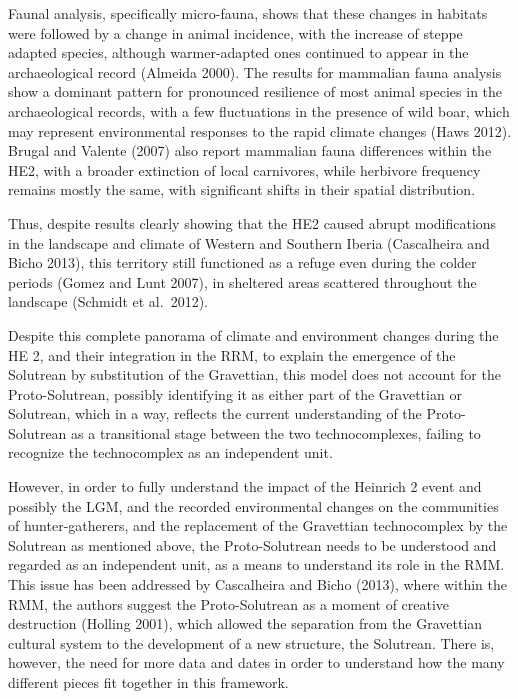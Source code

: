 \documentclass[12pt,twoside]{reedthesis}
\begin{document}
Faunal analysis, specifically micro-fauna, shows that these changes in habitats were followed by a change in animal incidence, with the increase of steppe adapted species, although warmer-adapted ones continued to appear in the archaeological record (Almeida 2000). The results for mammalian fauna analysis show a dominant pattern for pronounced resilience of most animal species in the archaeological records, with a few fluctuations in the presence of wild boar, which may represent environmental responses to the rapid climate changes (Haws 2012). Brugal and Valente (2007) also report mammalian fauna differences within the HE2, with a broader extinction of local carnivores, while herbivore frequency remains mostly the same, with significant shifts in their spatial distribution.

Thus, despite results clearly showing that the HE2 caused abrupt modifications in the landscape and climate of Western and Southern Iberia (Cascalheira and Bicho 2013), this territory still functioned as a refuge even during the colder periods (Gomez and Lunt 2007), in sheltered areas scattered throughout the landscape (Schmidt et al.~2012).

Despite this complete panorama of climate and environment changes during the HE 2, and their integration in the RRM, to explain the emergence of the Solutrean by substitution of the Gravettian, this model does not account for the Proto-Solutrean, possibly identifying it as either part of the Gravettian or Solutrean, which in a way, reflects the current understanding of the Proto-Solutrean as a transitional stage between the two technocomplexes, failing to recognize the technocomplex as an independent unit.

However, in order to fully understand the impact of the Heinrich 2 event and possibly the LGM, and the recorded environmental changes on the communities of hunter-gatherers, and the replacement of the Gravettian technocomplex by the Solutrean as mentioned above, the Proto-Solutrean needs to be understood and regarded as an independent unit, as a means to understand its role in the RMM. This issue has been addressed by Cascalheira and Bicho (2013), where within the RMM, the authors suggest the Proto-Solutrean as a moment of creative destruction (Holling 2001), which allowed the separation from the Gravettian cultural system to the development of a new structure, the Solutrean. There is, however, the need for more data and dates in order to understand how the many different pieces fit together in this framework.
\end{document}
